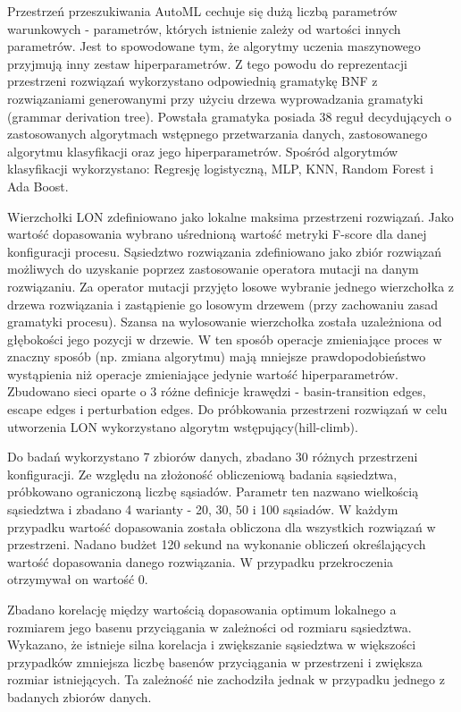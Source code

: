 Przestrzeń przeszukiwania AutoML cechuje się dużą liczbą parametrów warunkowych - parametrów, których istnienie zależy od wartości innych parametrów.
Jest to spowodowane tym, że algorytmy uczenia maszynowego przyjmują inny zestaw hiperparametrów.
Z tego powodu do reprezentacji przestrzeni rozwiązań wykorzystano odpowiednią gramatykę BNF z rozwiązaniami generowanymi
przy użyciu drzewa wyprowadzania gramatyki (grammar derivation tree).
Powstała gramatyka posiada 38 reguł decydujących o zastosowanych algorytmach wstępnego przetwarzania danych,
zastosowanego algorytmu klasyfikacji oraz jego hiperparametrów.
Spośród algorytmów klasyfikacji wykorzystano: Regresję logistyczną, MLP, KNN, Random Forest i Ada Boost.

Wierzchołki LON zdefiniowano jako lokalne maksima przestrzeni rozwiązań.
Jako wartość dopasowania wybrano uśrednioną wartość metryki F-score dla danej konfiguracji procesu.
Sąsiedztwo rozwiązania zdefiniowano jako zbiór rozwiązań możliwych do uzyskanie poprzez zastosowanie operatora
mutacji na danym rozwiązaniu. Za operator mutacji przyjęto losowe wybranie jednego wierzchołka z drzewa rozwiązania
i zastąpienie go losowym drzewem (przy zachowaniu zasad gramatyki procesu). Szansa na wylosowanie wierzchołka
została uzależniona od głębokości jego pozycji w drzewie. W ten sposób operacje zmieniające proces w znaczny sposób
(np. zmiana algorytmu) mają mniejsze prawdopodobieństwo wystąpienia niż operacje zmieniające jedynie wartość hiperparametrów.
Zbudowano sieci oparte o 3 różne definicje krawędzi - basin-transition edges, escape edges i perturbation edges.
Do próbkowania przestrzeni rozwiązań w celu utworzenia LON wykorzystano algorytm wstępujący(hill-climb).

Do badań wykorzystano 7 zbiorów danych, zbadano 30 różnych przestrzeni konfiguracji.
Ze względu na złożoność obliczeniową badania sąsiedztwa, próbkowano ograniczoną liczbę sąsiadów.
Parametr ten nazwano wielkością sąsiedztwa i zbadano 4 warianty - 20, 30, 50 i 100 sąsiadów.
W każdym przypadku wartość dopasowania została obliczona dla wszystkich rozwiązań w przestrzeni.
Nadano budżet 120 sekund na wykonanie obliczeń określających wartość dopasowania danego rozwiązania.
W przypadku przekroczenia otrzymywał on wartość 0.

Zbadano korelację między wartością dopasowania optimum lokalnego a rozmiarem jego basenu przyciągania w zależności
od rozmiaru sąsiedztwa. Wykazano, że istnieje silna korelacja i zwiększanie sąsiedztwa w większości przypadków zmniejsza liczbę
basenów przyciągania w przestrzeni i zwiększa rozmiar istniejących.
Ta zależność nie zachodziła jednak w przypadku jednego z badanych zbiorów danych.

